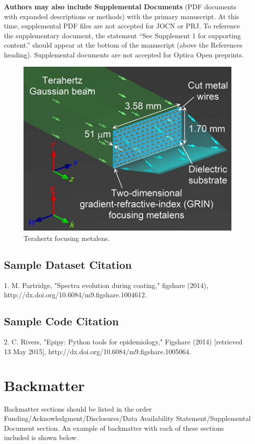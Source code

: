 \documentclass[9pt,twocolumn,twoside]{opticajnl}
\begin{document}
\textbf{Authors may also include Supplemental Documents} (PDF documents with expanded descriptions or methods) with the primary manuscript. At this time, supplemental PDF files are not accepted for JOCN or PRJ. To reference the supplementary document, the statement ``See Supplement 1 for supporting content.'' should appear at the bottom of the manuscript (above the References heading). Supplemental documents are not accepted for Optica Open preprints.

\begin{figure}[ht!]
\centering\includegraphics{opticafig2}
\caption{Terahertz focusing metalens.}
\end{figure}


\subsection{Sample Dataset Citation}

1. M. Partridge, "Spectra evolution during coating," figshare (2014), http://dx.doi.org/10.6084/m9.figshare.1004612.

\subsection{Sample Code Citation}

2. C. Rivers, "Epipy: Python tools for epidemiology," Figshare (2014) [retrieved 13 May 2015], http://dx.doi.org/10.6084/m9.figshare.1005064.

\section{Backmatter}
Backmatter sections should be listed in the order Funding/Acknowledgment/Disclosures/Data Availability Statement/Supplemental Document section. An example of backmatter with each of these sections included is shown below.
\end{document}
